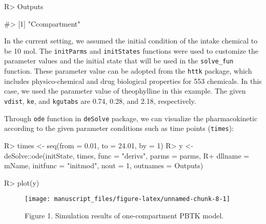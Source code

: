 \documentclass[article]{jss}
\begin{document}
\begin{CodeChunk}

\begin{CodeInput}
R> Outputs
\end{CodeInput}

\begin{CodeOutput}
#> [1] "Ccompartment"
\end{CodeOutput}
\end{CodeChunk}

In the current setting, we assumed the initial condition of the intake
chemical to be 10 mol. The \texttt{initParms} and \texttt{initStates}
functions were used to customize the parameter values and the initial
state that will be used in the \texttt{solve\_fun} function. These
parameter value can be adopted from the \texttt{httk} package, which
includes physico-chemical and drug biological properties for 553
chemicals. In this case, we used the parameter value of theophylline in
this example. The given \texttt{vdist}, \texttt{ke}, and
\texttt{kgutabs} are 0.74, 0.28, and 2.18, respectively.

Through \texttt{ode} function in \texttt{deSolve} package, we can
visualize the pharmacokinetic according to the given parameter
conditions such as time points (\texttt{times}):

\begin{CodeChunk}

\begin{CodeInput}
R> times <- seq(from = 0.01, to = 24.01, by = 1)
R> y <- deSolve::ode(initState, times, func = "derivs", parms = parms, 
R+                   dllname = mName, initfunc = "initmod", nout = 1, outnames = Outputs)
\end{CodeInput}
\end{CodeChunk}

\begin{CodeChunk}

\begin{CodeInput}
R> plot(y)
\end{CodeInput}
\begin{figure}

{\centering \texttt{[image: manuscript\_files/figure-latex/unnamed-chunk-8-1]} 

}

\caption[Figure 1]{Figure 1. Simulation results of one-compartment PBTK model.}\label{fig:unnamed-chunk-8}
\end{figure}
\end{CodeChunk}
\end{document}
